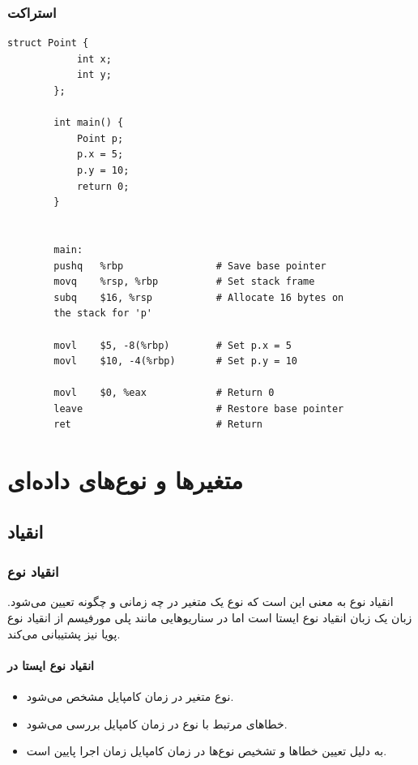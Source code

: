 \documentclass[12pt, a4paper]{report}
\begin{document}
\subsection{استراکت}
\begin{LTR} %
	\begin{lstlisting}[breaklines=true]
		struct Point {
			int x;
			int y;
		};
		
		int main() {
			Point p;
			p.x = 5;
			p.y = 10;
			return 0;
		}
		
		
		main:
		pushq   %rbp                # Save base pointer
		movq    %rsp, %rbp          # Set stack frame
		subq    $16, %rsp           # Allocate 16 bytes on 
		the stack for 'p'
		
		movl    $5, -8(%rbp)        # Set p.x = 5
		movl    $10, -4(%rbp)       # Set p.y = 10
		
		movl    $0, %eax            # Return 0
		leave                       # Restore base pointer
		ret                         # Return
	\end{lstlisting}
\end{LTR}
\chapter{متغیرها و نوع‌های داده‌ای}
\section{انقیاد}

\subsection{انقیاد نوع}
انقیاد نوع به معنی این است که نوع یک متغیر در چه زمانی و چگونه تعیین می‌‌شود. زبان  یک زبان انقیاد نوع ایستا است اما در سناریو‌هایی مانند پلی مورفیسم از انقیاد نوع پویا نیز پشتیبانی می‌کند.

\subsubsection{انقیاد نوع ایستا در }
\begin{itemize}
	\item نوع متغیر در زمان کامپایل مشخص می‌شود.
	\item خطاهای مرتبط با نوع در زمان کامپایل بررسی می‌شود.
	\item به دلیل تعیین خطاها و تشخیص نوع‌ها در زمان کامپایل زمان اجرا پایین است.
\end{itemize}
\end{document}

